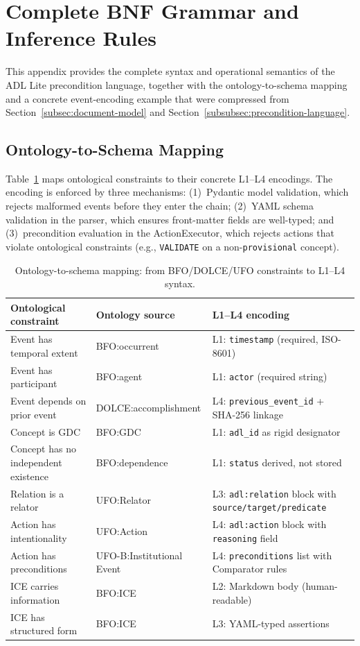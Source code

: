 \section{Complete BNF Grammar and Inference Rules}\label{app:bnf}

This appendix provides the complete syntax and operational semantics of the ADL Lite precondition language, together with the ontology-to-schema mapping and a concrete event-encoding example that were compressed from Section~\ref{subsec:document-model} and Section~\ref{subsubsec:precondition-language}.

\subsection{Ontology-to-Schema Mapping}

Table~\ref{tab:ontology-schema-mapping-full} maps ontological constraints to their concrete L1--L4 encodings. The encoding is enforced by three mechanisms: (1)~Pydantic model validation, which rejects malformed events before they enter the chain; (2)~YAML schema validation in the parser, which ensures front-matter fields are well-typed; and (3)~precondition evaluation in the ActionExecutor, which rejects actions that violate ontological constraints (e.g., \texttt{VALIDATE} on a non-\texttt{provisional} concept).

\begin{table}[htbp]
\centering
\caption{Ontology-to-schema mapping: from BFO/DOLCE/UFO constraints to L1--L4 syntax.}
\label{tab:ontology-schema-mapping-full}
\begin{tabular}{@{}p{3.5cm}p{3.2cm}p{4.8cm}@{}}
\toprule
\textbf{Ontological constraint} & \textbf{Ontology source} & \textbf{L1--L4 encoding} \\
\midrule
Event has temporal extent & BFO:occurrent & L1: \texttt{timestamp} (required, ISO-8601) \\
Event has participant & BFO:agent & L1: \texttt{actor} (required string) \\
Event depends on prior event & DOLCE:accomplishment & L4: \texttt{previous\_event\_id} + SHA-256 linkage \\
Concept is GDC & BFO:GDC & L1: \texttt{adl\_id} as rigid designator \\
Concept has no independent existence & BFO:dependence & L1: \texttt{status} derived, not stored \\
Relation is a relator & UFO:Relator & L3: \texttt{adl:relation} block with \texttt{source/target/predicate} \\
Action has intentionality & UFO:Action & L4: \texttt{adl:action} block with \texttt{reasoning} field \\
Action has preconditions & UFO-B:Institutional Event & L4: \texttt{preconditions} list with Comparator rules \\
ICE carries information & BFO:ICE & L2: Markdown body (human-readable) \\
ICE has structured form & BFO:ICE & L3: YAML-typed assertions \\
\bottomrule
\end{tabular}
\end{table}

